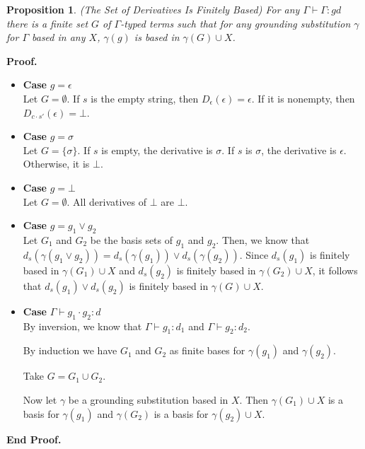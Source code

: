 \documentclass{article}
\newcommand{\judgebalance}[3][\Gamma]{{#1} \vdash {#2} : {#3}}
\newcommand{\setof}[1]{\{{#1}\}}
\newcommand{\deriv}[2]{d_{#1}({#2})}
\newtheorem{prop}{Proposition}
\newenvironment{proof}{\noindent\textbf{Proof.}}{\noindent\textbf{End Proof.}}
\newenvironment{caseblock}{\begin{itemize}}{\end{itemize}}
\newenvironment{case}[1]{\item \textbf{Case} {#1}\\}{}
\begin{document}
\begin{prop}{(The Set of Derivatives Is Finitely Based)}
For any $\judgebalance{\Gamma}{g}{d}$ there is a finite set $G$ of
$\Gamma$-typed terms such that for any grounding substitution $\gamma$
for $\Gamma$ based in any $X$, $\gamma(g)$ is based in $\gamma(G) \cup
X$.
\end{prop}

\begin{proof}
\begin{caseblock}
  \begin{case}{$g = \epsilon$}
    Let $G = \emptyset$. If $s$ is the empty string, 
    then $D_\epsilon(\epsilon) = \epsilon$. If it is nonempty, then $D_{c\cdot s'}(\epsilon) = \bot$. 
  \end{case}

  \begin{case}{$g = \sigma$}
    Let $G = \setof{\sigma}$. If $s$ is empty, the derivative is $\sigma$. 
    If $s$ is $\sigma$, the derivative is $\epsilon$. Otherwise, it is $\bot$. 
  \end{case}

  \begin{case}{$g = \bot$}
    Let $G = \emptyset$. All derivatives of $\bot$ are $\bot$. 
  \end{case}

  \begin{case}{$g = g_1 \vee g_2$}
    Let $G_1$ and $G_2$ be the basis sets of $g_1$ and $g_2$. Then, we know 
    that $\deriv{s}{\gamma(g_1 \vee g_2)} = \deriv{s}{\gamma(g_1)} \vee \deriv{s}{\gamma(g_2)}$. Since
    $\deriv{s}{g_1}$ is finitely based in $\gamma(G_1) \cup X$ and $\deriv{s}{g_2}$ is finitely based in $\gamma(G_2) \cup X$, 
    it follows that $\deriv{s}{g_1} \vee \deriv{s}{g_2}$ is finitely based in $\gamma(G) \cup X$. 
  \end{case}

  \begin{case}{$\judgebalance{g_1\cdot g_2}{d}$}
    By inversion, we know that $\judgebalance{g_1}{d_1}$ and $\judgebalance{g_2}{d_2}$.
    
    By induction we have $G_1$ and $G_2$ as finite bases for $\gamma(g_1)$ and $\gamma(g_2)$. 
    
    Take $G = G_1 \cup G_2$. 

    Now let $\gamma$ be a grounding substitution based in $X$. Then 
    $\gamma(G_1) \cup X$ is a basis for $\gamma(g_1)$ and $\gamma(G_2)$ is a basis
    for $\gamma(g_2) \cup X$. 


\end{case}
\end{caseblock}
\end{proof}
\end{document}
